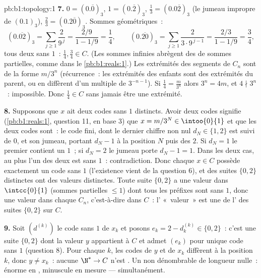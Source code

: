 \begin{solution}{pb:b1:topology:1}
\textbf{7.} $0 = (0.\overline 0)_3$, $1 = (0.\overline 2)_3$,
$\frac13 = (0.0\overline{2})_3$ (le jumeau impropre de $(0.1)_3$),
$\frac23 = (0.2\overline{0})_3$. Sommes géométriques~:
\[
(0.\overline{02})_3 = \sum_{j\geq1} \frac{2}{9^{\,j}}
= \frac{2/9}{1 - 1/9} = \frac14 ,
\qquad
(0.\overline{20})_3 = \sum_{j\geq1} \frac{2}{3\cdot 9^{\,j-1}}
= \frac{2/3}{1 - 1/9} = \frac34 ,
\]
tous deux sans $1$~: $\frac14, \frac34 \in C$. (Les sommes infinies
abrègent des  de sommes partielles, comme dans
le \cref{pb:b1:reals:1}.) Les extrémités des segments de $C_n$ sont de
la forme $m/3^n$ (récurrence~: les extrémités des enfants sont des
extrémités du parent, ou en diffèrent d'un multiple de
$3^{-n-1}$). Si $\frac14 = \frac{m}{3^n}$ alors $3^n = 4m$, et
$4 \nmid 3^n$~: impossible. Donc $\frac14 \in C$ sans jamais être
une extrémité.

\textbf{8.} Supposons que $x$ ait deux codes sans $1$ distincts. Avoir
deux codes signifie (\cref{pb:b1:reals:1}, question 11, en base
$3$) que $x = m/3^N \in \intoo{0}{1}$ et que les deux codes sont~:
le code fini, dont le dernier chiffre non nul $d_N \in \{1, 2\}$ est
suivi de $0$, et son jumeau, portant $d_N - 1$ à la position $N$
puis des $2$. Si $d_N = 1$ le premier contient un $1$~; si $d_N
= 2$ le jumeau porte $d_N - 1 = 1$. Dans les deux cas, au plus l'un
des deux est sans $1$~: contradiction. Donc chaque $x \in C$ possède
exactement un code sans $1$ (l'existence vient de la question 6), et
des suites $\{0,2\}$ distinctes ont des valeurs distinctes. Toute
suite $\{0,2\}$ a une valeur dans $\intcc{0}{1}$ (sommes partielles
$\leq 1$) dont tous les préfixes sont sans $1$, donc une valeur dans
chaque $C_n$, c'est-à-dire dans $C$~: l' «~valeur~» est
une  de l' des suites $\{0,2\}$ sur $C$.

\textbf{9.} Soit $(d^{(k)})$ le code sans $1$ de $x_k$ et posons
$e_k = 2 - d^{(k)}_k \in \{0, 2\}$~: c'est une suite $\{0,2\}$ dont
la valeur $y$ appartient à $C$ et admet $(e_k)$ pour unique code sans
$1$ (question 8). Pour chaque $k$, les codes de $y$ et de $x_k$
diffèrent à la position $k$, donc $y \neq x_k$~: aucune 
$\N^* \to C$ n'est . Un  non dénombrable de
longueur nulle~: énorme en , minuscule en mesure ---
simultanément.


\end{solution}
